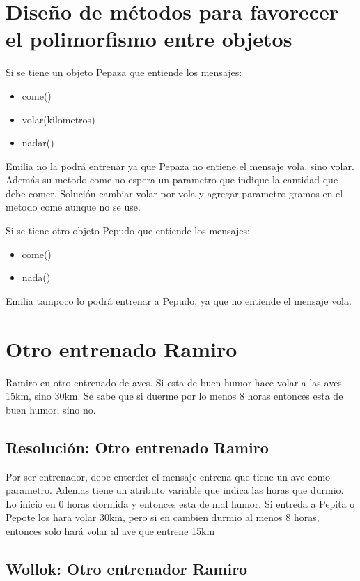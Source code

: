\documentclass[11pt,a4paper]{article}
\begin{document}
\section{Diseño de métodos para favorecer el polimorfismo entre objetos}

Si se tiene un objeto Pepaza que entiende los mensajes:

\begin{itemize}
	\item come()
	\item volar(kilometros)
	\item nadar()
\end{itemize}

Emilia no la podrá entrenar ya que 	Pepaza no entiene el mensaje vola, sino volar. Además su metodo come no espera un parametro que indique la cantidad que debe comer.
Solución cambiar volar por vola y agregar parametro gramos en el metodo come aunque no se use.

Si se tiene otro objeto Pepudo que entiende los mensajes:

\begin{itemize}
	\item come()
	\item nada()
\end{itemize}

Emilia tampoco lo podrá entrenar a Pepudo, ya que no entiende el mensaje vola. 

\section{Otro entrenado Ramiro}
Ramiro en otro entrenado de aves. Si esta de buen humor hace volar a las aves 15km, sino 30km. Se sabe que si duerme por lo menos 8 horas entonces esta de buen humor, sino no.
\subsection{Resolución: Otro entrenado Ramiro}
Por ser entrenador, debe enterder el mensaje entrena que tiene un ave como parametro. Ademas tiene un atributo variable que indica las horas que durmio. Lo inicio en 0 horas dormida y entonces esta de mal humor. Si entreda a Pepita o Pepote los hara volar 30km, pero si en cambien durmio al menos 8 horas, entonces solo hará volar al ave que entrene 15km

\subsection{Wollok: Otro entrenador Ramiro}

\end{document}
